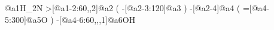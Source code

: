                      @{a1}H_2N%
     >[@{a1-2}:60,,2]@{a2}%
                        (
           -[@{a2-3}:120]@{a3}%
                        )
           -[@{a2-4}]@{a4}%
                        (
           =[@{a4-5}:300]@{a5}O%
                        )
    -[@{a4-6}:60,,,1]@{a6}OH%